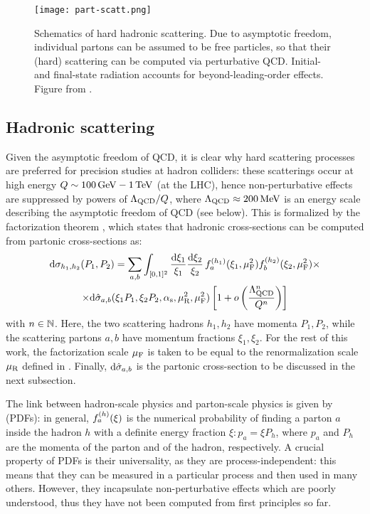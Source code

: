 
\begin{figure}
  \centering
  \texttt{[image: part-scatt.png]}
  \caption{Schematics of hard hadronic scattering. Due to asymptotic freedom, individual partons can be assumed to be free particles, so that their (hard) scattering can be computed via perturbative QCD. Initial- and final-state radiation accounts for beyond-leading-order effects. Figure from \cite{Asteriadis-2020}.}
  \label{fig:part-scatt}
\end{figure}

\subsection{Hadronic scattering}

Given the asymptotic freedom of QCD, it is clear why hard scattering processes are preferred for precision studies at hadron colliders: these scatterings occur at high energy $ Q \sim 100\,\mathrm{GeV} - 1\,\mathrm{TeV} $ (at the LHC), hence non-perturbative effects are suppressed by powers of $ \Lambda_\text{QCD} / Q $, where $ \Lambda_\text{QCD} \approx 200\,\mathrm{MeV} $ is an energy scale describing the asymptotic freedom of QCD (see below). This is formalized by the factorization theorem \cite{Collins-1989}, which states that hadronic cross-sections can be computed from partonic cross-sections as:
\begin{multline}
  \mathrm{d}\sigma_{h_1,h_2}(P_1 , P_2) = \sum_{a,b} \int_{[0,1]^2} \frac{\mathrm{d} \xi_1}{\xi_1} \frac{\mathrm{d} \xi_2}{\xi_2} \, f_{a}^{(h_1)}(\xi_1, \mu_\text{F}^2) f_{b}^{(h_2)}(\xi_2, \mu_\text{F}^2) \times \\
  \times \mathrm{d}\hat{\sigma}_{a,b}(\xi_1 P_1, \xi_2 P_2, \alpha_\text{s}, \mu_\text{R}^2, \mu_\text{F}^2)
  \left[ 1 + o \left( \frac{\Lambda_\text{QCD}^n}{Q^n} \right) \right]
  \label{eq:fact-th}
\end{multline}
with $ n \in \mathbb{N} $. Here, the two scattering hadrons $ h_1 , h_2 $ have momenta $ P_1 , P_2 $, while the scattering partons $ a , b $ have momentum fractions $ \xi_1 , \xi_2 $. For the rest of this work, the factorization scale $ \mu_\text{F} $ is taken to be equal to the renormalization scale $ \mu_\text{R} $ defined in . Finally, $ \mathrm{d}\hat{\sigma}_{a,b} $ is the partonic cross-section to be discussed in the next subsection.

The link between hadron-scale physics and parton-scale physics is given by  (PDFs): in general, $ f_{a}^{(h)}(\xi) $ is the numerical probability of finding a parton $ a $ inside the hadron $ h $ with a definite energy fraction $ \xi : p_a = \xi P_h $, where $ p_a $ and $ P_h $ are the momenta of the parton and of the hadron, respectively. A crucial property of PDFs is their universality, as they are process-independent: this means that they can be measured in a particular process and then used in many others. However, they incapsulate non-perturbative effects which are poorly understood, thus they have not been computed from first principles so far.

